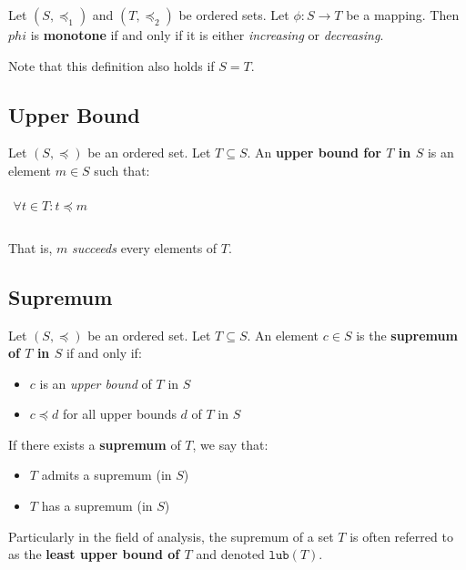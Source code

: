 Let $(S, \preceq_1)$ and $(T, \preceq_2)$ be ordered sets. Let
$\phi: S \to T$ be a mapping. Then $phi$ is \textbf{monotone} if and
only if it is either \textit{increasing} or \textit{decreasing}.

Note that this definition also holds if $S = T$.




\subsection{Upper Bound}
\label{sec:upper-bound}

Let $(S, \preceq)$ be an ordered set. Let $T \subseteq S$. An
\textbf{upper bound for $T$ in $S$} is an element $m \in S$ such that:

\begin{math}
  \begin{array}{c}
    \\
    \forall t \in T : t \preceq m\\
    \\
  \end{array}
\end{math}

That is, $m$ \textit{succeeds} every elements of $T$.



\subsection{Supremum}
\label{sec:supremum}

Let $(S, \preceq)$ be an ordered set. Let $T \subseteq S$. An element
$c \in S$ is the \textbf{supremum of $T$ in $S$} if and only if:

\begin{itemize}
\item $c$ is an \textit{upper bound} of $T$ in $S$
\item $c \preceq d$ for all upper bounds $d$ of $T$ in $S$
\end{itemize}

If there exists a \textbf{supremum} of $T$, we say that:

\begin{itemize}
\item $T$ admits a supremum (in $S$)
\item $T$ has a supremum (in $S$)
\end{itemize}


Particularly in the field of analysis, the supremum of a set $T$ is
often referred to as the \textbf{least upper bound of $T$} and denoted
$\mathtt{lub}(T)$.


